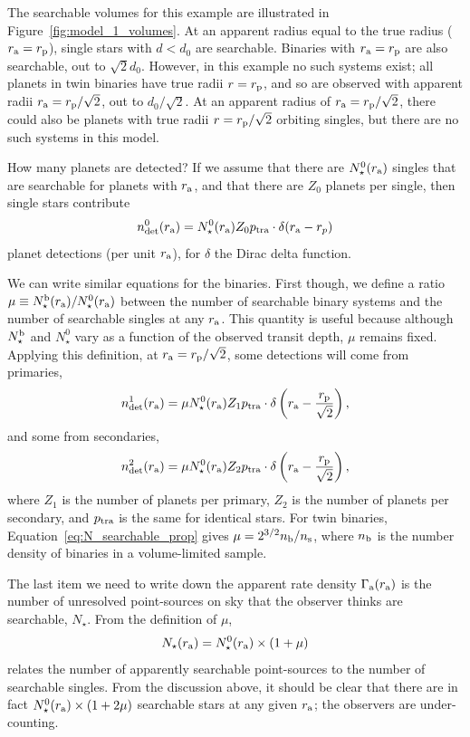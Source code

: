 \documentclass[12pt,modern]{aastex61}
\renewcommand{\a}{_{\rm a}}
\newcommand{\p}{_{\rm p}}
\begin{document}
The searchable volumes for this example are illustrated in 
Figure~\ref{fig:model_1_volumes}.
At an apparent radius equal to the true radius ($r\a=r\p$), single stars 
with $d<d_0$ are searchable.
Binaries with $r\a=r\p$ are also searchable, out to $\sqrt{2}d_0$. 
However, in this example no such systems exist; all planets in twin binaries 
have true radii $r=r\p$, and so are observed with apparent radii 
$r\a=r\p/\sqrt{2}$, out to $d_0/\sqrt{2}$.
At an apparent radius of $r\a=r\p/\sqrt{2}$, there could also be planets with 
true radii $r=r\p/\sqrt{2}$ orbiting singles, but there are no such systems 
in this model.

How many planets are detected?
If we assume that there are $N_\star^0(r\a)$ singles that are searchable for 
planets with $r\a$, and that there are $Z_0$ planets per single, then 
single stars contribute
\begin{equation}
n_{\rm det}^0(r\a) = N_\star^0(r\a) Z_0 p_{\rm tra} \cdot \delta(r\a - r_p)
\end{equation}
planet detections (per unit $r\a$), for $\delta$ the Dirac delta function.

We can write similar equations for the binaries.
First though, we define a ratio $\mu \equiv N_\star^{\rm b}(r\a) / 
N_\star^0(r\a)$ 
between the number of searchable binary systems and the number of searchable 
singles at any $r\a$.
This quantity is useful because although $N_\star^{\rm b}$ and $N_\star^0$ vary
as a function of the observed transit depth, $\mu$ remains fixed.
Applying this definition, at $r\a=r\p/\sqrt{2}$, some detections will come 
from primaries,
\begin{equation}
n_{\rm det}^1(r\a) =
\mu N_\star^0(r\a) Z_1 p_{\rm tra}
\cdot \delta\left(r\a - \frac{r\p}{\sqrt{2}}\right),
\end{equation}
and some from secondaries,
\begin{equation}
n_{\rm det}^2(r\a) = 
\mu N_\star^0(r\a) Z_2 p_{\rm tra}
\cdot \delta\left(r\a - \frac{r\p}{\sqrt{2}}\right),
\end{equation}
where $Z_1$ is the number of planets per primary, $Z_2$ is the number of 
planets per secondary, and $p_{\rm tra}$ is the same for identical stars.
For twin binaries, Equation~\ref{eq:N_searchable_prop} gives $\mu = 
2^{3/2} n_{\rm b}/n_{\rm s}$, where $n_{\rm b}$ is the number density of 
binaries in a volume-limited sample.

The last item we need to write down the apparent rate density $\Gamma\a(r\a)$ 
is the number of unresolved point-sources on sky that the observer thinks are 
searchable, $N_\star$.
From the definition of $\mu$,
\begin{equation}
N_\star(r\a) = N_\star^0(r\a) \times (1 + \mu)
\label{eq:apparentlysearchable_to_searchable}
\end{equation}
relates the number of apparently searchable point-sources to the number of 
searchable singles.
From the discussion above, it should be clear that there are in fact
$N_\star^0(r\a)\times (1 + 2\mu)$ searchable stars at any given $r\a$; the 
observers are under-counting.
\end{document}

